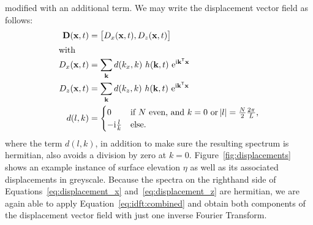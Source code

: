 modified with an additional term. We may write the displacement vector field as follows:
\begin{align}
 \mathbf{D}(\mathbf{x},t) &= \left[D_x(\mathbf{x},t), D_z(\mathbf{x},t)\right]\\
\intertext{with}
\label{eq:displacement_x} D_x(\mathbf{x},t) &= \sum_{\mathbf{k}}d(k_x, 
k)~h(\mathbf{k},t)~\mathrm{e}^{\mathrm{i}\mathbf{k}^{\mathsf{T}}\mathbf{x}} \\
\label{eq:displacement_z} D_z(\mathbf{x},t) &= \sum_{\mathbf{k}}d(k_z, 
k)~h(\mathbf{k},t)~\mathrm{e}^{\mathrm{i}\mathbf{k}^{\mathsf{T}}\mathbf{x}} \\
 d(l, k) &= \begin{cases}
             0 &\text{if $N$ even, and $k = 0$ or $\abs{l} = 
\frac{N}{2}\frac{2\pi}{L}$,} \\
             -\mathrm{i}\frac{l}{k} &\text{else.}
            \end{cases}
\end{align}
where the term $d(l, k)$, in addition to make sure the resulting spectrum is 
hermitian, also avoids a division by zero at $k = 0$. 
Figure~\ref{fig:displacements} shows an example instance of surface elevation 
$\eta$ as well as its associated displacements in greyscale.
Because the spectra on the righthand side of Equations~\ref{eq:displacement_x} 
and~\ref{eq:displacement_z} are hermitian, we are again able to apply 
Equation~\ref{eq:idft:combined} and obtain both components of the displacement 
vector field with just one inverse Fourier Transform.\\


